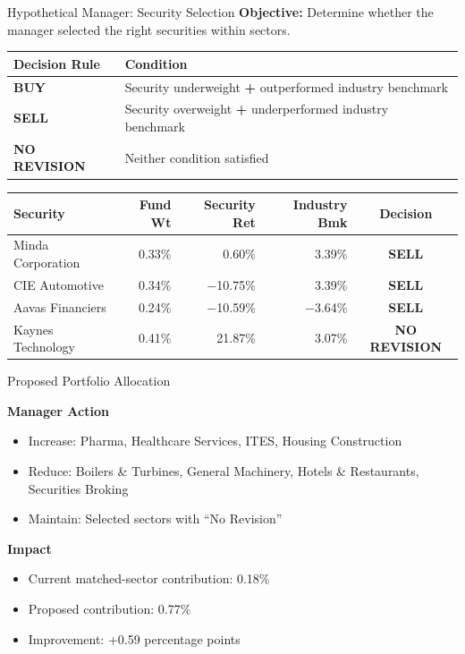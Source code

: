 \documentclass[11pt, aspectratio=43]{beamer}
\begin{document}
\begin{frame}{Hypothetical Manager: Security Selection}
\textbf{Objective:} Determine whether the manager selected the right securities within sectors.

\vspace{0.4em}
\centering
\footnotesize
\begin{tabular}{l l}
\toprule
\textbf{Decision Rule} & \textbf{Condition} \\
\midrule
\textcolor{posgreen}{\textbf{BUY}} & Security underweight \textbf{+} outperformed industry benchmark \\
\textcolor{negred}{\textbf{SELL}} & Security overweight \textbf{+} underperformed industry benchmark \\
\textbf{NO REVISION} & Neither condition satisfied \\
\bottomrule
\end{tabular}

\vspace{0.8em}
\begin{tabular}{l r r r c}
\toprule
\textbf{Security} & \textbf{Fund Wt} & \textbf{Security Ret} & \textbf{Industry Bmk} & \textbf{Decision} \\
\midrule
Minda Corporation & 0.33\% & 0.60\% & 3.39\% & \textcolor{negred}{\textbf{SELL}} \\
CIE Automotive & 0.34\% & $-$10.75\% & 3.39\% & \textcolor{negred}{\textbf{SELL}} \\
Aavas Financiers & 0.24\% & $-$10.59\% & $-$3.64\% & \textcolor{negred}{\textbf{SELL}} \\
Kaynes Technology & 0.41\% & 21.87\% & 3.07\% & \textbf{NO REVISION} \\
\bottomrule
\end{tabular}
\end{frame}

\begin{frame}{Proposed Portfolio Allocation}

\textbf{Manager Action}
\begin{itemize}
    \item Increase: Pharma, Healthcare Services, ITES, Housing Construction
    \item Reduce: Boilers \& Turbines, General Machinery, Hotels \& Restaurants, Securities Broking
    \item Maintain: Selected sectors with “No Revision”
    
\end{itemize}

\textbf{Impact}
\begin{itemize}
\item Current matched-sector contribution: 0.18\%
\item Proposed contribution: 0.77\%
\item Improvement: +0.59 percentage points
\end{itemize}
    
\end{frame}
\end{document}
